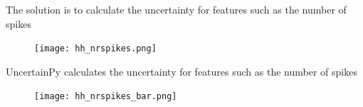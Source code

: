 \documentclass[presentation]{beamer}
\begin{document}
\begin{frame}{The solution is to calculate the uncertainty for features such as the number of spikes}
\vspace{-5mm}
\begin{figure}
   \texttt{[image: hh\_nrspikes.png]}
\end{figure}
\end{frame}

\begin{frame}{UncertainPy calculates the uncertainty for features such as the number of spikes}
\vspace{-5mm}
\begin{figure}
   \texttt{[image: hh\_nrspikes\_bar.png]}
\end{figure}
\end{frame}


\end{document}
